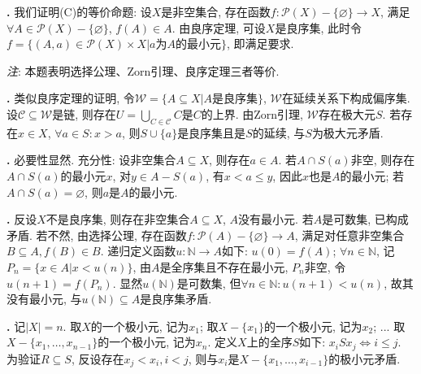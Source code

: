 \par \textbf{\thesolset .} 我们证明(C)的等价命题: 设$X$是非空集合, 存在函数$f:\mathcal{P}(X)-\{\varnothing\}\to X$, 满足$\forall A\in \mathcal{P}(X)-\{\varnothing\}$, $f(A)\in A$. 由良序定理, 可设$X$是良序集, 此时令$f=\{(A,a)\in \mathcal{P}(X)\times X\vert a\text{为}A\text{的最小元}\}$, 即满足要求. 
\par \emph{注}: 本题表明选择公理、Zorn引理、良序定理三者等价. 


\par \textbf{\thesolset .} 类似良序定理的证明, 令$\mathcal{W}=\{A\subseteq X\vert A\text{是良序集}\}$, $\mathcal{W}$在延续关系下构成偏序集. 设$\mathcal{C}\subseteq \mathcal{W}$是链, 则存在$U=\bigcup_{C\in \mathcal{C}} C$是$C$的上界. 由Zorn引理, $\mathcal{W}$存在极大元$S$. 若存在$x\in X$, $\forall a\in S: x>a$, 则$S\cup \{a\}$是良序集且是$S$的延续, 与$S$为极大元矛盾. 

\par \textbf{\thesolset .} 必要性显然. 充分性: 设非空集合$A\subseteq X$, 则存在$a\in A$. 若$A\cap S(a)$非空, 则存在$A\cap S(a)$的最小元$x$, 对$y\in A-S(a)$, 有$x<a\le y$, 因此$x$也是$A$的最小元; 若$A\cap S(a)= \varnothing$, 则$a$是$A$的最小元. 

\par \textbf{\thesolset .} 反设$X$不是良序集, 则存在非空集合$A\subseteq X$, $A$没有最小元. 若$A$是可数集, 已构成矛盾. 若不然, 由选择公理, 存在函数$f:\mathcal{P}(A)-\{\varnothing\}\to A$, 满足对任意非空集合$B\subseteq A, f(B)\in B$. 递归定义函数$u:\mathbb{N}\to A$如下: $u(0)=f(A)$; $\forall n\in \mathbb{N}$, 记$P_n=\{x\in A\vert x<u(n)\}$, 由$A$是全序集且不存在最小元, $P_n$非空, 令$u(n+1)=f(P_n)$. 显然$u(\mathbb{N})$是可数集, 但$\forall n\in \mathbb{N}: u(n+1)<u(n)$, 故其没有最小元, 与$u(\mathbb{N})\subseteq A$是良序集矛盾. 

\par \textbf{\thesolset .} \cite{IC} 记$|X|=n$. 取$X$的一个极小元, 记为$x_1$; 取$X-\{x_1\}$的一个极小元, 记为$x_2$; ... 取$X-\{x_1,\dots,x_{n-1}\}$的一个极小元, 记为$x_n$. 定义$X$上的全序$S$如下: $x_i S  x_j \iff i\le j$. 为验证$R\subseteq S$, 反设存在$x_j<x_i, i<j$, 则与$x_i$是$X-\{x_1,\dots,x_{i-1}\}$的极小元矛盾. 

